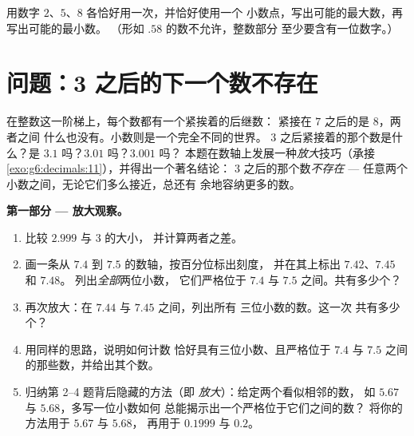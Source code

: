 \begin{exercise}[$\star\star\star$]\label{exo:g6:decimals:12}
用数字 $2$、$5$、$8$ 各恰好用一次，并恰好使用一个
小数点，写出可能的最大数，再写出可能的最小数。
（形如 $.58$ 的数不允许，整数部分
至少要含有一位数字。）
\end{exercise}

\section{问题：3 之后的下一个数不存在}

\begin{problem}
\label{pb:g6:decimals:1}
在整数这一阶梯上，每个数都有一个紧挨着的后继数：
紧接在 $7$ 之后的是 $8$，两者之间
什么也没有。小数则是一个完全不同的世界。
$3$ 之后紧接着的那个数是什么？是 $3.1$ 吗？$3.01$ 吗？$3.001$ 吗？
本题在数轴上发展一种\emph{放大}技巧（承接
\cref{exo:g6:decimals:11}），并得出一个著名结论：
$3$ 之后的那个数\emph{不存在} ---
任意两个小数之间，无论它们多么接近，总还有
余地容纳更多的数。

\medskip
\noindent\textbf{第一部分 --- 放大观察。}
\begin{enumerate}
  \item 比较 $2.999$ 与 $3$ 的大小，
        并计算两者之差。
  \item 画一条从 $7.4$ 到 $7.5$ 的数轴，按百分位标出刻度，
        并在其上标出 $7.42$、$7.45$ 和 $7.48$。
        列出\emph{全部}两位小数，
        它们严格位于 $7.4$ 与 $7.5$ 之间。共有多少个？
  \item 再次放大：在 $7.44$ 与 $7.45$ 之间，列出所有
        三位小数的数。这一次
        共有多少个？
  \item 用同样的思路，说明如何计数
        恰好具有三位小数、且严格位于
        $7.4$ 与 $7.5$ 之间的那些数，并给出其个数。
  \item 归纳第 2--4 题背后隐藏的方法（即
        \emph{放大}）：给定两个看似相邻的数，
        如 $5.67$ 与 $5.68$，多写一位小数如何
        总能揭示出一个严格位于它们之间的数？
        将你的方法用于 $5.67$ 与 $5.68$，
        再用于 $0.1999$ 与 $0.2$。
\end{enumerate}


\end{problem}
